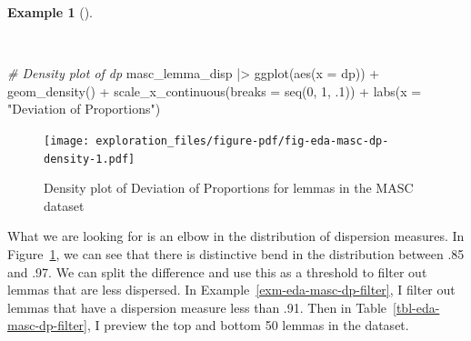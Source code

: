 \documentclass[
  letterpaper,
  DIV=11,
  numbers=noendperiod]{scrreport}
\newenvironment{Shaded}{\begin{snugshade}}{\end{snugshade}}
\newcommand{\AttributeTok}[1]{\textcolor[rgb]{0.00,0.00,0.00}{#1}}
\newcommand{\CommentTok}[1]{\textcolor[rgb]{0.00,0.00,0.00}{\textit{#1}}}
\newcommand{\DecValTok}[1]{\textcolor[rgb]{0.00,0.00,0.00}{#1}}
\newcommand{\FunctionTok}[1]{\textcolor[rgb]{0.00,0.00,0.00}{#1}}
\newcommand{\NormalTok}[1]{\textcolor[rgb]{0.00,0.00,0.00}{#1}}
\newcommand{\SpecialCharTok}[1]{\textcolor[rgb]{0.00,0.00,0.00}{#1}}
\newcommand{\StringTok}[1]{\textcolor[rgb]{0.00,0.00,0.00}{#1}}
\theoremstyle{definition}
\newtheorem{example}{Example}[chapter]
\theoremstyle{remark}
\begin{document}
\begin{example}[]\protect\hypertarget{exm-eda-masc-dp-density}{}\label{exm-eda-masc-dp-density}

~

\begin{Shaded}
\begin{Highlighting}[]
\CommentTok{\# Density plot of dp}
\NormalTok{masc\_lemma\_disp }\SpecialCharTok{|\textgreater{}} 
  \FunctionTok{ggplot}\NormalTok{(}\FunctionTok{aes}\NormalTok{(}\AttributeTok{x =}\NormalTok{ dp)) }\SpecialCharTok{+}
  \FunctionTok{geom\_density}\NormalTok{() }\SpecialCharTok{+}
  \FunctionTok{scale\_x\_continuous}\NormalTok{(}\AttributeTok{breaks =} \FunctionTok{seq}\NormalTok{(}\DecValTok{0}\NormalTok{, }\DecValTok{1}\NormalTok{, .}\DecValTok{1}\NormalTok{)) }\SpecialCharTok{+}
  \FunctionTok{labs}\NormalTok{(}\AttributeTok{x =} \StringTok{"Deviation of Proportions"}\NormalTok{)}
\end{Highlighting}
\end{Shaded}

\begin{figure}[H]

{\centering \texttt{[image: exploration\_files/figure-pdf/fig-eda-masc-dp-density-1.pdf]}

}

\caption{\label{fig-eda-masc-dp-density}Density plot of Deviation of
Proportions for lemmas in the MASC dataset}

\end{figure}

\end{example}

What we are looking for is an elbow in the distribution of dispersion
measures. In Figure~\ref{fig-eda-masc-dp-density}, we can see that there
is distinctive bend in the distribution between .85 and .97. We can
split the difference and use this as a threshold to filter out lemmas
that are less dispersed. In Example~\ref{exm-eda-masc-dp-filter}, I
filter out lemmas that have a dispersion measure less than .91. Then in
Table~\ref{tbl-eda-masc-dp-filter}, I preview the top and bottom 50
lemmas in the dataset.
\end{document}
